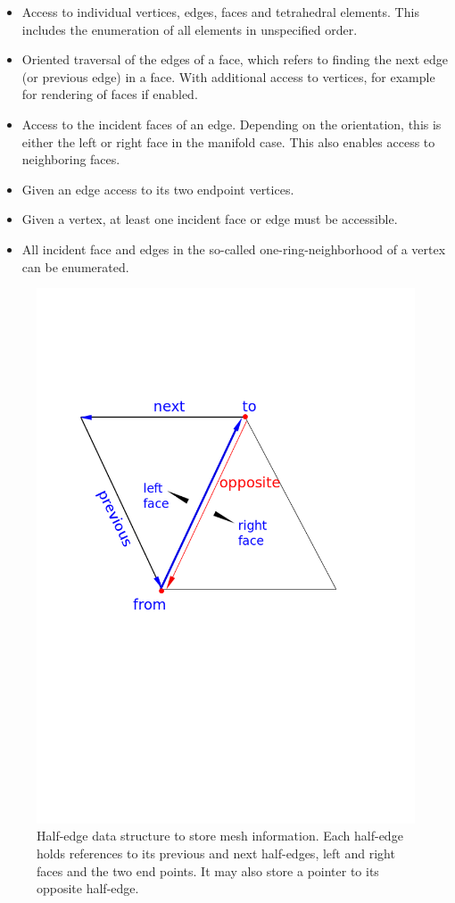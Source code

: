 \begin{itemize}
 \item Access to individual vertices, edges, faces and tetrahedral elements. This includes the enumeration of 
 all elements in unspecified order.
 \item Oriented traversal of the edges of a face, which refers to finding the next edge (or previous edge) in a face.
 With additional access to vertices, for example for rendering of faces if enabled.
 \item Access to the incident faces of an edge. Depending on the orientation, this is either the left or right face in the manifold case.
 This also enables access to neighboring faces.
 
 \item Given an edge access to its two endpoint vertices.
 
 \item Given a vertex, at least one incident face or edge must be accessible. 
 
 \item All incident face and edges in the so-called one-ring-neighborhood of a vertex can be enumerated.
\end{itemize}


\begin{figure}[H]
  \centering
  \includegraphics[width=0.8\linewidth]{figures/cutting/halfedge.png}
  \caption{\label{fig:halfedge}
  {Half-edge data structure to store mesh information. Each half-edge holds references to its previous and next half-edges,
  left and right faces and the two end points. It may also store a pointer to its opposite half-edge.}
}
\end{figure}

